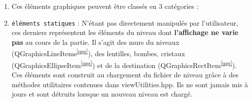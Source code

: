\documentclass[a4paper,11pt]{report}
\begin{document}
\begin{enumerate}
	\item[] Ces éléments graphiques peuvent être classés en 3 catégories :
	\item \texttt{éléments statiques} : 
		N'étant pas directement manipulés par l'utilisateur, ces derniers représentent
		les éléments du niveau dont \textbf{l'affichage ne varie pas} au cours de la partie. Il
		s'agit des murs du niveaux (QGraphicsLineItems\textsuperscript{\ref{qgs}}), des lentilles, bombes,
		cristaux (QGraphicsEllipseItem\textsuperscript{\ref{qgs}}) et de la destination
		(QGraphicsRectItem\textsuperscript{\ref{qgs}}).
		Ces éléments sont construit au chargement du fichier de niveau grâce à
		des méthodes utilitaires contenues dans viewUtilities.hpp. 
		Ils ne sont jamais mis à jours et sont détruits lorsque un nouveau niveau est
		chargé. 


\end{enumerate}
\end{document}
